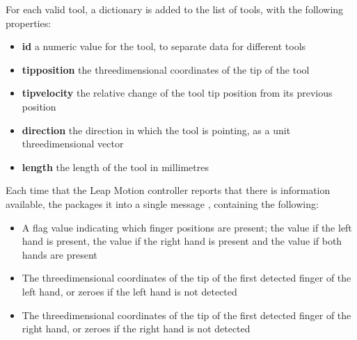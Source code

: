 For each valid tool, a dictionary is added to the list of tools, with the following
properties:
\begin{itemize}
\item\textbf{id} \longDash{} a numeric value for the tool, to separate data for different
tools
\item\exSp\textbf{tipposition} \longDash{} the three\longDash{}dimensional coordinates of
the tip of the tool
\item\exSp\textbf{tipvelocity} \longDash{} the relative change of the tool tip position
from its previous position
\item\exSp\textbf{direction} \longDash{} the direction in which the tool is pointing, as a
unit three\longDash{}dimensional vector
\item\exSp\textbf{length} \longDash{} the length of the tool in millimetres
\end{itemize}
\primaryEnd
{}
Each time that the Leap Motion controller reports that there is information available,
the  packages it into a single message
\openSq{}\closeSq, containing the following:
\begin{itemize}
\item A flag value indicating which finger positions are present; the value  if
the left hand is present, the value  if the right hand is present and the value
 if both hands are present
\item\exSp{}The three\longDash{}dimensional coordinates of the tip of the first detected
finger of the left hand, or zeroes if the left hand is not detected
\item\exSp{}The three\longDash{}dimensional coordinates of the tip of the first detected
finger of the right hand, or zeroes if the right hand is not detected
\end{itemize}
\primaryEnd{}
